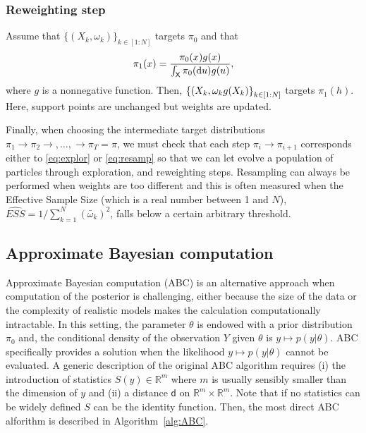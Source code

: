 \documentclass[english,graybox,envcountchap,envcountsame,sectrefs,shortlabels]{svmono}
\theoremstyle{style}
\newcommand{\Xset}{\mathsf{X}}
\begin{document}
\subsubsection*{Reweighting step}
Assume that $\{(X_k,\omega_k)\}_{k\in[1:N]}$ targets $\pi_0$ and that
\begin{equation} \label{eq:resamp}
\pi_1(x)=\frac{ \pi_0(x) g(x) }{\int_\Xset \pi_0(\rmd u) g(u) },
\end{equation}
where $g$ is a nonnegative function. Then,  $\left\{ (X_k,\omega_k g(X_k) \right\}_{k\in[1:N]}$ targets $\pi_1(h)$. Here, support points are unchanged but weights are updated.

Finally, when choosing the intermediate target distributions $\pi_1\rightarrow \pi_2\rightarrow,\ldots,\rightarrow \pi_T=\pi$, we must check that each step $\pi_i \rightarrow \pi_{i+1}$ corresponds either to \eqref{eq:explor} or \eqref{eq:resamp} so that we can let evolve a population of particles through exploration, and reweighting steps. Resampling can always be performed when weights are too different and this is often measured when the Effective Sample Size (which is a real number between 1 and $N$), $\widehat{ESS}=1/\sum_{k=1}^N (\bar \omega_k)^2$, falls below a certain arbitrary threshold.



\subsection{Approximate Bayesian computation}
Approximate Bayesian computation (ABC) is an alternative approach when computation of the posterior is challenging, either because the size of the data or the complexity of realistic models makes the calculation computationally intractable. In this setting, the parameter $\theta$ is endowed with a prior distribution $\pi_0$ and, the conditional density of the observation $Y$ given $\theta$ is $y\mapsto p(y|\theta)$. ABC specifically provides a solution  when the likelihood $y\mapsto p(y|\theta)$ cannot be evaluated. A generic description of the original ABC algorithm requires (i) the introduction of statistics $S(y)\in\mathbb{R}^m$ where $m$ is usually sensibly smaller than the dimension of $y$ and (ii) a distance $\mathsf{d}$ on $\mathbb{R}^m\times \mathbb{R}^m$. Note that if no statistics can be widely defined $S$ can be the identity function. Then, the most direct ABC alforithm is described in Algorithm~\ref{alg:ABC}.

\medskip
\end{document}
